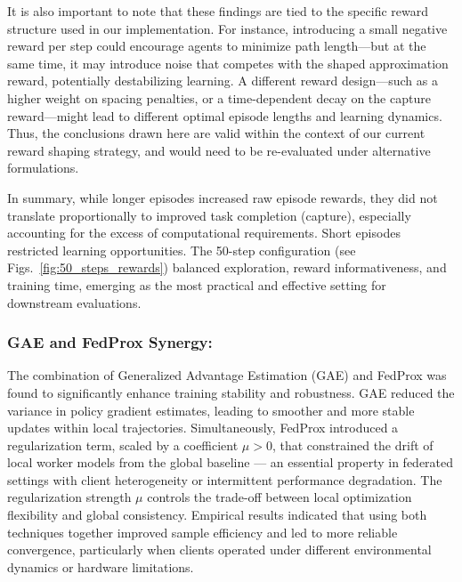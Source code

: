 \documentclass[12pt,a4paper,twoside,openany]{book}
\begin{document}
It is also important to note that these findings are tied to the specific reward structure used in our implementation. For instance, introducing a small negative reward per step could encourage agents to minimize path length—but at the same time, it may introduce noise that competes with the shaped approximation reward, potentially destabilizing learning. A different reward design—such as a higher weight on spacing penalties, or a time-dependent decay on the capture reward—might lead to different optimal episode lengths and learning dynamics. Thus, the conclusions drawn here are valid within the context of our current reward shaping strategy, and would need to be re-evaluated under alternative formulations.

In summary, while longer episodes increased raw episode rewards, they did not translate proportionally to improved task completion (capture), especially accounting for the excess of computational requirements. Short episodes restricted learning opportunities. The 50-step configuration (see Figs.~\ref{fig:50_steps_rewards}) balanced exploration, reward informativeness, and training time, emerging as the most practical and effective setting for downstream evaluations.

\subsubsection{GAE and FedProx Synergy:}
The combination of Generalized Advantage Estimation (GAE) and FedProx was found to significantly enhance training stability and robustness. GAE reduced the variance in policy gradient estimates, leading to smoother and more stable updates within local trajectories. Simultaneously, FedProx introduced a regularization term, scaled by a coefficient $\mu > 0$, that constrained the drift of local worker models from the global baseline — an essential property in federated settings with client heterogeneity or intermittent performance degradation. The regularization strength $\mu$ controls the trade-off between local optimization flexibility and global consistency. Empirical results indicated that using both techniques together improved sample efficiency and led to more reliable convergence, particularly when clients operated under different environmental dynamics or hardware limitations.
\end{document}
